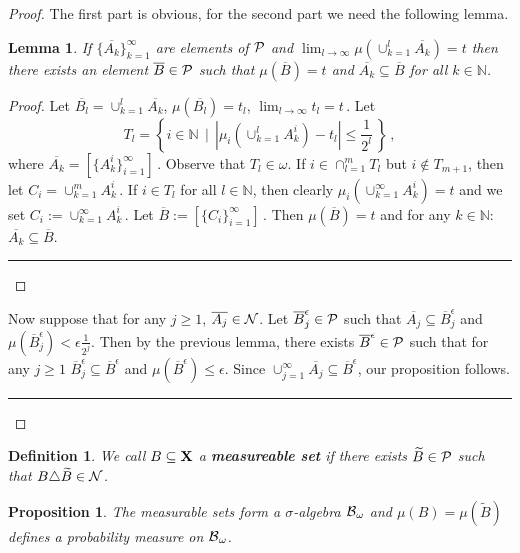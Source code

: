\documentclass [11pt] {article}
\newcommand{\qed} {\hspace {0.1in} \rule {1.5mm} {3.5mm}}
\newtheorem{lemma}{Lemma}[section]
\newtheorem{proposition}{Proposition}[section]
\newtheorem{definition}{Definition}[section]
\def\e{\epsilon}
\def\bN{{\mathbb N}}\def\bQ{{\mathbb Q}}
\def\cB{\mbox{$\cal B$}}
\def\cB{\mbox{$\cal B$}}
\def\cP{\mbox{$\cal P$}}
\def\cN{\mbox{$\cal N$}}
\def\to{\rightarrow}
\def\xo{{\bf X}}
\def\bo{\cB_\omega}
\def\muo{\mu}
\begin{document}
\begin{proof}
The first part is obvious, for the second part we need the following lemma.
\begin{lemma}\label{l6}
If $\{\overline{A_k}\}^\infty_{k=1}$ are elements of $\cP$
and $\lim_{l\to\infty} \muo(\cup^l_{k=1}\overline{A_k})=t$  then
there exists an element $\overline{B}\in\cP$ such that
$\muo(\overline{B})=t$ and $\overline{A_k}\subseteq \overline{B}$
for all $k\in \bN$.
\end{lemma}
\begin{proof}
Let $\overline{B_l}=\cup^l_{k=1}\overline{A_k}$, $\muo(\overline{B_l})=t_l$,
$\lim_{l\to\infty} t_l=t\,.$ Let
$$T_l=\left\{i\in\bN\,\mid\,
|\mu_i(\cup^l_{k=1} A^i_k)-t_l|\leq \frac{1}{2^l}\,\right\}\,,$$
where $\overline{A_k}=[\{A^i_k\}^\infty_{i=1}]\,.$
Observe that $T_l\in \omega$. If $i\in \cap^m_{l=1}T_l$ but
$i\notin T_{m+1}$, then let $C_i=\cup^m_{k=1} A^i_k\,.$
If $i\in T_l$ for all $l\in \bN$, then clearly $\mu_i(\cup^\infty_{k=1}
A^i_k)=t$ and
 we set $C_i:=\cup^\infty_{k=1} A^i_k\,.$
Let $\overline{B}:=[\{C_i\}^\infty_{i=1}]\,.$ Then
$\muo(\overline{B})=t$ and for any $k\in\bN$:
$\overline{A_k}\subseteq \overline{B}$. \qed \end{proof} \vskip 0.2in

\noindent
Now suppose that for any $j\geq 1$, $\overline{A_j}\in\cN$. Let
$\overline{B}^\e_j\in\cP$ such that $\overline{A_j}\subseteq
\overline{B}^\e_j$ and $\muo(\overline{B}^\e_j)<\e\frac{1}{2^j}$.
Then by the previous lemma, there exists $\overline{B}^\e\in\cP$ such that
for any $j\geq 1$
$\overline{B}^\e_j\subseteq \overline{B}^\e$ and $\muo(\overline{B}^\e)\leq\e$.
Since $\cup^\infty_{j=1} \overline{A_j}\subseteq \overline{B}^\e$, our
proposition follows. \qed \end{proof} \vskip 0.2in
\begin{definition}
We call $B\subseteq \xo$ a {\bf measureable set} if there exists
$\widetilde{B}\in \cP$
such that $B\triangle \widetilde{B}\in \cN$.
\end{definition}
\begin{proposition}
The measurable sets form a $\sigma$-algebra $\bo$ and $\muo(B)=
\muo(\widetilde{B})$
defines a probability measure on $\bo$.
\end{proposition}
\end{document}
